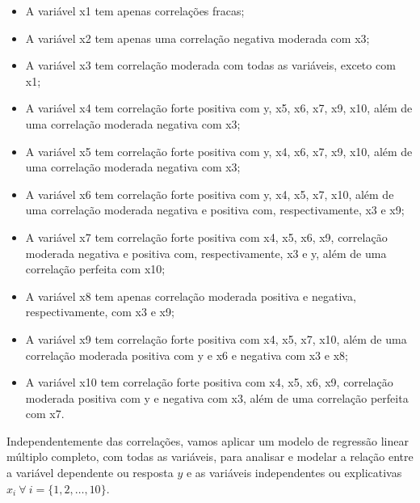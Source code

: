 \documentclass[
  letterpaper,
  DIV=11,
  numbers=noendperiod]{scrartcl}
\begin{document}
\begin{itemize}
  \item A variável x1 tem apenas correlações fracas;
  \item A variável x2 tem apenas uma correlação negativa moderada com x3;
  \item A variável x3 tem correlação moderada com todas as variáveis, exceto com x1;
  \item A variável x4 tem correlação forte positiva com y, x5, x6, x7, x9, x10, além de uma correlação moderada negativa com x3;
  \item A variável x5 tem correlação forte positiva com y, x4, x6, x7, x9, x10, além de uma correlação moderada negativa com x3;
  \item A variável x6 tem correlação forte positiva com y, x4, x5, x7, x10, além de uma correlação moderada negativa e positiva com, respectivamente, x3 e x9;
  \item A variável x7 tem correlação forte positiva com x4, x5, x6, x9, correlação moderada negativa e positiva com, respectivamente, x3 e y, além de uma correlação perfeita com x10;
  \item A variável x8 tem apenas correlação moderada positiva e negativa, respectivamente, com x3 e x9;
  \item A variável x9 tem correlação forte positiva com x4, x5, x7, x10, além de uma correlação moderada positiva com y e x6 e negativa com x3 e x8;
  \item A variável x10 tem correlação forte positiva com x4, x5, x6, x9, correlação moderada positiva com y e negativa com x3, além de uma correlação perfeita com x7.
\end{itemize}

Independentemente das correlações, vamos aplicar um modelo de regressão
linear múltiplo completo, com todas as variáveis, para analisar e
modelar a relação entre a variável dependente ou resposta \(y\) e as
variáveis independentes ou explicativas
\(x_i \ \forall \ i = \{ 1,2,\dots,10 \}\).
\end{document}
